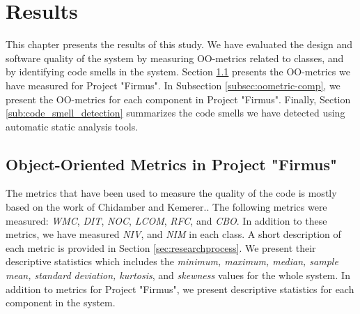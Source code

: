 
\chapter{Results}
\label{chap:results}

This chapter presents the results of this study. We have evaluated the design and software quality of the system by measuring OO-metrics related to classes, and by identifying code smells in the system. Section \ref{sec:oometricsFirmus} presents the OO-metrics we have measured for Project "Firmus". In Subsection \ref{subsec:oometric-comp}, we present the OO-metrics for each component in Project "Firmus". Finally, Section \ref{sub:code_smell_detection} summarizes the code smells we have detected using automatic static analysis tools.







\section{Object-Oriented Metrics in Project "Firmus"}
\label{sec:oometricsFirmus}
The metrics that have been used to measure the quality of the code is mostly based on the work of Chidamber and Kemerer.\cite{chidamber1994metrics}. The following metrics were measured: \textit{WMC}, \textit{DIT}, \textit{NOC}, \textit{LCOM}, \textit{RFC}, and \textit{CBO}. In addition to these metrics, we have measured \textit{NIV}, and \textit{NIM} in each class. A short description of each metric is provided in Section \ref{sec:researchprocess}. We present their descriptive statistics which includes the \textit{minimum, maximum, median, sample mean, standard deviation, kurtosis}, and \textit{skewness} values for the whole system. In addition to metrics for Project "Firmus", we present descriptive statistics for each component in the system.

